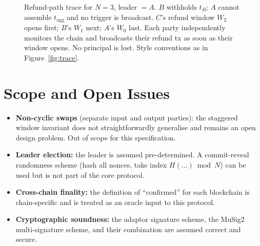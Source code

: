 \documentclass[11pt,a4paper,dvipsnames]{article}
\newcommand{\tagg}{t_{\mathrm{agg}}}
\begin{document}
\begin{figure}[p]
\caption{Refund-path trace for $N=3$, leader $= A$.
  $B$ withholds $t_B$; $A$ cannot assemble $\tagg$ and no trigger is
  broadcast.
  $C$'s refund window $W_2$ opens first; $B$'s $W_1$ next; $A$'s $W_0$
  last.
  Each party independently monitors the chain and broadcasts their refund tx
  as soon as their window opens.
  No principal is lost.
  Style conventions as in Figure~\ref{fig:trace}.}
\label{fig:trace-refund}
\end{figure}

\section{Scope and Open Issues}

\begin{itemize}
  \item \textbf{Non-cyclic swaps} (separate input and output parties):
    the staggered window invariant does not straightforwardly generalise and
    remains an open design problem.
    Out of scope for this specification.
  \item \textbf{Leader election:}
    the leader is assumed pre-determined.
    A commit-reveal randomness scheme (hash all nonces, take index
    $H(\ldots)\bmod N$) can be used but is not part of the core protocol.
  \item \textbf{Cross-chain finality:}
    the definition of ``confirmed'' for each blockchain is chain-specific
    and is treated as an oracle input to this protocol.
  \item \textbf{Cryptographic soundness:}
    the adaptor signature scheme, the MuSig2 multi-signature scheme, and their
    combination are assumed correct and secure.
\end{itemize}



\end{document}
